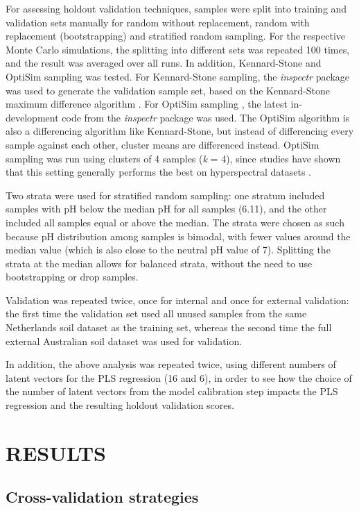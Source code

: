 \documentclass{isprs}
\begin{document}
For assessing holdout validation techniques, samples were split into training and validation sets manually for random without replacement, random with replacement (bootstrapping) and stratified random sampling. For the respective Monte Carlo simulations, the splitting into different sets was repeated 100 times, and the result was averaged over all runs. In addition, Kennard-Stone and OptiSim sampling was tested. For Kennard-Stone sampling, the \textit{inspectr} package was used to generate the validation sample set, based on the Kennard-Stone maximum difference algorithm \cite{kennard1969computer}. For OptiSim sampling \cite{clark1997optisim}, the latest in-development code from the \textit{inspectr} package was used. The OptiSim algorithm is also a differencing algorithm like Kennard-Stone, but instead of differencing every sample against each other, cluster means are differenced instead. OptiSim sampling was run using clusters of 4 samples (\textit{k} = 4), since studies have shown that this setting generally performs the best on hyperspectral datasets \cite{clark2003boosted}.

Two strata were used for stratified random sampling: one stratum included samples with pH below the median pH for all samples (6.11), and the other included all samples equal or above the median. The strata were chosen as such because pH distribution among samples is bimodal, with fewer values around the median value (which is also close to the neutral pH value of 7). Splitting the strata at the median allows for balanced strata, without the need to use bootstrapping or drop samples.

Validation was repeated twice, once for internal and once for external validation: the first time the validation set used all unused samples from the same Netherlands soil dataset as the training set, whereas the second time the full external Australian soil dataset was used for validation.

In addition, the above analysis was repeated twice, using different numbers of latent vectors for the PLS regression (16 and 6), in order to see how the choice of the number of latent vectors from the model calibration step impacts the PLS regression and the resulting holdout validation scores.

\section{RESULTS}\label{sec:RESULTS}

\subsection{Cross-validation strategies}\label{sec:Cross-validation strategies 2}
\end{document}
